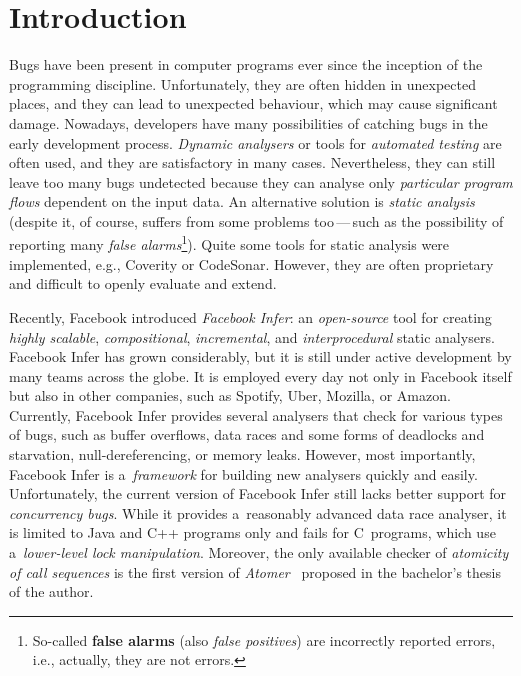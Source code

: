 \documentclass{ExcelAtFIT}
\affiliation{%
    *\href{mailto:xharmi00@stud.fit.vutbr.cz}{xharmi00@stud.fit.vutbr.cz},
    \textit{Faculty of Information Technology, Brno University of Technology}%
}
\theoremstyle{definition}
\begin{document}
\setlength{\abovedisplayskip}{.3em}
\setlength{\belowdisplayskip}{.3em}


\startdocument




\section{Introduction}

Bugs have been present in computer programs ever since the inception of the programming discipline. Unfortunately, they are often hidden in unexpected places, and they can lead to unexpected behaviour, which may cause significant damage. Nowadays, developers have many possibilities of catching bugs in the early development process. \emph{Dynamic analysers} or tools for \emph{automated testing} are often used, and they are satisfactory in many cases. Nevertheless, they can still leave too many bugs undetected because they can analyse only \emph{particular program flows} dependent on the input data. An alternative solution is \emph{static analysis} (despite it, of course, suffers from some problems too\,---\,such as the possibility of reporting many \emph{false alarms}\footnote{So-called \textbf{false alarms} (also \emph{false positives}) are incorrectly reported errors, i.e., actually, they are not errors.}). Quite some tools for static analysis were implemented, e.g., Coverity or CodeSonar. However, they are often proprietary and difficult to openly evaluate and extend.

Recently, Facebook introduced \emph{Facebook Infer}: an \emph{open-source} tool for creating \emph{highly scalable}, \emph{compositional}, \emph{incremental}, and \emph{interprocedural} static analysers. Facebook Infer has grown considerably, but it is still under active development by many teams across the globe. It is employed every day not only in Facebook itself but also in other companies, such as Spotify, Uber, Mozilla, or Amazon. Currently, Facebook Infer provides several analysers that check for various types of bugs, such as buffer overflows, data races and some forms of deadlocks and starvation, null-dereferencing, or memory leaks. However, most importantly, Facebook Infer is a~\emph{framework} for building new analysers quickly and easily. Unfortunately, the current version of Facebook Infer still lacks better support for \emph{concurrency bugs}. While it provides a~reasonably advanced data race analyser, it is limited to Java and C++ programs only and fails for C~programs, which use a~\emph{lower-level lock manipulation}. Moreover, the only available checker of \emph{atomicity of call sequences} is the first version of \emph{Atomer}~\cite{harmimBP} proposed in the bachelor's thesis of the author.
\end{document}
